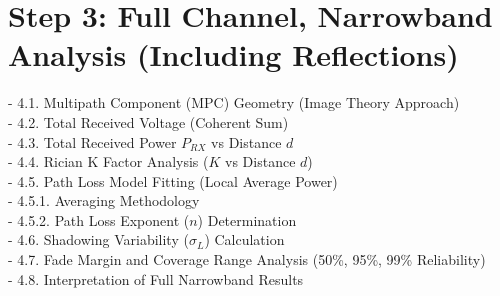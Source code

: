 \chapter{Step 3: Full Channel, Narrowband Analysis (Including Reflections)}
- 4.1. Multipath Component (MPC) Geometry (Image Theory Approach)\\
- 4.2. Total Received Voltage (Coherent Sum)\\
- 4.3. Total Received Power $P_{RX}$ vs Distance $d$\\
- 4.4. Rician K Factor Analysis ($K$ vs Distance $d$)\\
- 4.5. Path Loss Model Fitting (Local Average Power)\\
- 4.5.1. Averaging Methodology\\
- 4.5.2. Path Loss Exponent ($n$) Determination\\
- 4.6. Shadowing Variability ($\sigma_L$) Calculation\\
- 4.7. Fade Margin and Coverage Range Analysis (50\%, 95\%, 99\% Reliability)\\
- 4.8. Interpretation of Full Narrowband Results\\